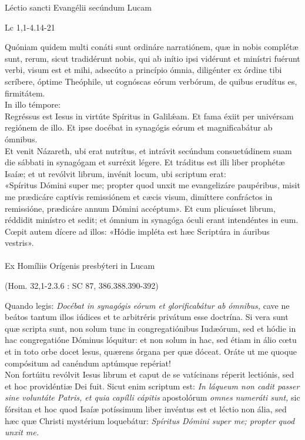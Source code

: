 \documentclass[options]{article}
\begin{document}
	Léctio sancti Evangélii secúndum Lucam
	\begin{flushright}
	Lc  1,1-4.14-21	
	\end{flushright}
	Quóniam quidem multi conáti sunt ordináre narratiónem, quæ in nobis complétæ sunt, rerum, sicut tradidérunt nobis, qui ab inítio ipsi vidérunt et minístri fuérunt verbi, visum est et mihi, adsecúto a princípio ómnia, diligénter ex órdine tibi scríbere, óptime Theóphile, ut cognóscas eórum verbórum, de quibus erudítus es, firmitátem.\\
	In illo témpore:\\
	Regréssus est Iesus in virtúte Spíritus in Galil\'{æ}am. Et fama éxiit per univérsam regiónem de illo. Et ipse docébat in synagógis eórum et magnificabátur ab ómnibus.\\
	Et venit Názareth, ubi erat nutrítus, et intrávit secúndum consuetúdinem suam die sábbati in synagógam et surréxit légere. Et tráditus est illi liber prophétæ Isaíæ; et ut revólvit librum, invénit locum, ubi scriptum erat:\\
	«Spíritus Dómini super me; propter quod unxit me evangelizáre paupéribus, misit me prædicáre captívis remissiónem et cæcis visum, dimíttere confráctos in remissióne, prædicáre annum Dómini accéptum».
	Et cum plicuísset librum, réddidit minístro et sedit; et ómnium in synagóga óculi erant intendéntes in eum. Cœpit autem dícere ad illos: «Hódie impléta est hæc Scriptúra in áuribus vestris».\\
	\\
	Ex Homíliis Orígenis presbýteri in Lucam\\
	\begin{flushright}
		(Hom. 32,1-2.3.6 : SC 87, 386.388.390-392)	
	\end{flushright}
	Quando legis: \emph{Docébat in synagógis eórum et glorificabátur ab ómnibus,} cave ne beátos tantum illos iúdices et te arbitréris privátum esse doctrína. Si vera sunt quæ scripta sunt, non solum tunc in congregatiónibus Iudæórum, sed et hódie in hac congregatióne Dóminus lóquitur: et non solum in hac, sed étiam in álio cœtu et in toto orbe docet lesus, quærens órgana per quæ dóceat. Oráte ut me quoque compósitum ad canéndum aptúmque repériat!\\
	Non fortúitu revólvit Iesus librum et caput de se vatícinans réperit lectiónis, sed et hoc providéntiæ Dei fuit. Sicut enim scriptum est: \emph{In láqueum non cadit passer sine voluntáte Patris, et quia capílli cápitis} apostolórum \emph{omnes numeráti sunt,} sic fórsitan et hoc quod Isaíæ potíssimum liber invéntus est et léctio non ália, sed hæc quæ Christi mystérium loquebátur: \emph{Spíritus Dómini super me; propter quod unxit me.}\\
\end{document}
